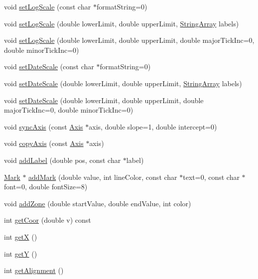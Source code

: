 \begin{DoxyCompactItemize}
\item 
void \hyperlink{class_axis_a344d2266d15c80d455e5cc9cd9e8b601}{set\+Log\+Scale} (const char $\ast$format\+String=0)
\item 
void \hyperlink{class_axis_a38921521a2868738d43f444f6061400c}{set\+Log\+Scale} (double lower\+Limit, double upper\+Limit, \hyperlink{class_string_array}{String\+Array} labels)
\item 
void \hyperlink{class_axis_a9f627fa0efdecec10a6cf63189553921}{set\+Log\+Scale} (double lower\+Limit, double upper\+Limit, double major\+Tick\+Inc=0, double minor\+Tick\+Inc=0)
\item 
void \hyperlink{class_axis_aac131ccbb91b9c5587334e2703923b70}{set\+Date\+Scale} (const char $\ast$format\+String=0)
\item 
void \hyperlink{class_axis_a8b68b9e92ed809ecadf3aa3e46c77983}{set\+Date\+Scale} (double lower\+Limit, double upper\+Limit, \hyperlink{class_string_array}{String\+Array} labels)
\item 
void \hyperlink{class_axis_a38cc17d35a91fee2075c2aa7e57e9da8}{set\+Date\+Scale} (double lower\+Limit, double upper\+Limit, double major\+Tick\+Inc=0, double minor\+Tick\+Inc=0)
\item 
void \hyperlink{class_axis_a27bf2d4b4c44ecf49e1ba7aad25bb897}{sync\+Axis} (const \hyperlink{class_axis}{Axis} $\ast$axis, double slope=1, double intercept=0)
\item 
void \hyperlink{class_axis_a66990afb53a3c4b709178d1cb019092c}{copy\+Axis} (const \hyperlink{class_axis}{Axis} $\ast$axis)
\item 
void \hyperlink{class_axis_ade3e74820cc853fdb4f577662ce78ae3}{add\+Label} (double pos, const char $\ast$label)
\item 
\hyperlink{class_mark}{Mark} $\ast$ \hyperlink{class_axis_afd32537a0ccccbef0efea8c28a285530}{add\+Mark} (double value, int line\+Color, const char $\ast$text=0, const char $\ast$font=0, double font\+Size=8)
\item 
void \hyperlink{class_axis_a999b49b9678d07a36a4175fd0a81fabd}{add\+Zone} (double start\+Value, double end\+Value, int color)
\item 
int \hyperlink{class_axis_a7a2277860d5f5d635a6d7156aeb1be33}{get\+Coor} (double v) const
\item 
int \hyperlink{class_axis_a5c742dfcee277adf63daf6bb35e69ffa}{getX} ()
\item 
int \hyperlink{class_axis_acad054ebcda8850d3d588ac6ed0c270d}{getY} ()
\item 
int \hyperlink{class_axis_a7e8e4de986cb83b59d23f0d9ed66deaf}{get\+Alignment} ()

\end{DoxyCompactItemize}
